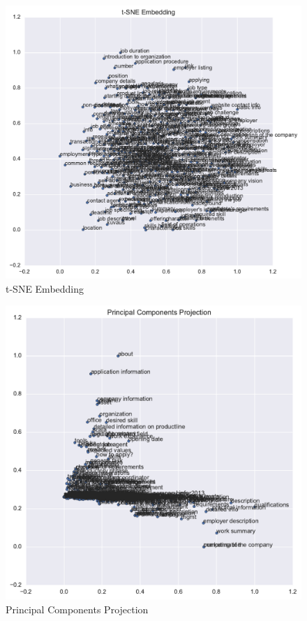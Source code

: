 \begin{figure}[h]
    \centering
    \includegraphics[width=\textwidth]{img/paragraph-data-tSNE.pdf}
    \caption{t-SNE Embedding}
\label{fig:paragraph-data-tSNE}
\end{figure}

\begin{figure}[h]
    \centering
    \includegraphics[width=\textwidth]{img/paragraph-data-principal-components-projection.pdf}
    \caption{Principal Components Projection}
\label{fig:paragraph-data-principal-components-projection}
\end{figure}

